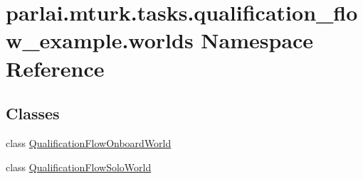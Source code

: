 \hypertarget{namespaceparlai_1_1mturk_1_1tasks_1_1qualification__flow__example_1_1worlds}{}\section{parlai.\+mturk.\+tasks.\+qualification\+\_\+flow\+\_\+example.\+worlds Namespace Reference}
\label{namespaceparlai_1_1mturk_1_1tasks_1_1qualification__flow__example_1_1worlds}
\subsection*{Classes}
\begin{DoxyCompactItemize}
\item 
class \hyperlink{classparlai_1_1mturk_1_1tasks_1_1qualification__flow__example_1_1worlds_1_1QualificationFlowOnboardWorld}{Qualification\+Flow\+Onboard\+World}
\item 
class \hyperlink{classparlai_1_1mturk_1_1tasks_1_1qualification__flow__example_1_1worlds_1_1QualificationFlowSoloWorld}{Qualification\+Flow\+Solo\+World}
\end{DoxyCompactItemize}
